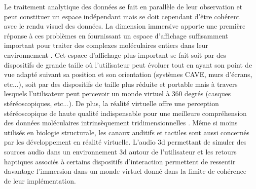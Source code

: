 Le traitement analytique des données se fait en parallèle de leur observation et peut constituer un espace indépendant mais se doit cependant d'être cohérent avec le rendu visuel des données. La dimension immersive apporte une première réponse à ces problèmes en fournissant un espace d'affichage suffisamment important pour traiter des complexes moléculaires entiers dans leur environnement \cite{van2000immersive}. Cet espace d'affichage plus important se fait soit par des dispositifs de grande taille où l'utilisateur peut évoluer tout en ayant son point de vue adapté suivant sa position et son orientation (systèmes CAVE, murs d'écrans, etc...), soit par des dispositifs de taille plus réduite et portable mais à travers lesquels l'utilisateur peut percevoir un monde virtuel à 360 degrés (casques stéréoscopiques, etc...). De plus, la réalité virtuelle offre une perception stéréoscopique de haute qualité indispensable pour une meilleure compréhension des données moléculaires intrinsèquement tridimensionnelles \cite{stone_immersive_2010,odonoghue_visualization_2010}. Même si moins utilisés en biologie structurale, les canaux auditifs et tactiles sont aussi concernés par les développement en réalité virtuelle. L'audio 3d permettant de simuler des sources audio dans un environnement 3d autour de l'utilisateur et les retours haptiques associés à certains dispositifs d'interaction permettent de ressentir davantage l'immersion dans un monde virtuel donné dans la limite de cohérence de leur implémentation. 

